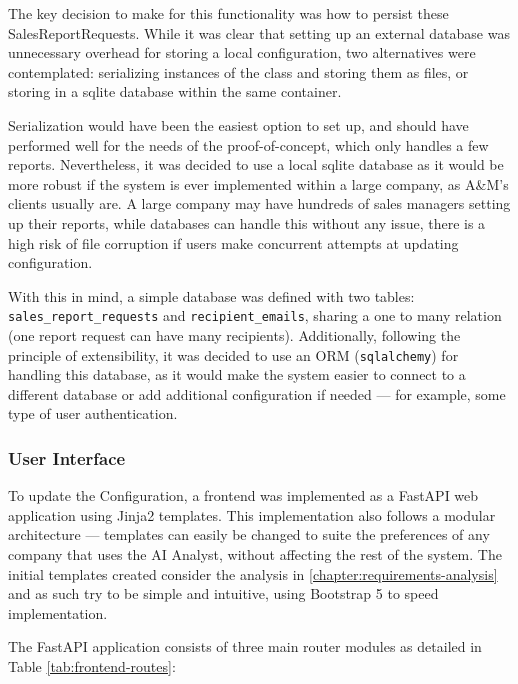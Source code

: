 \documentclass[a4paper]{report}
\begin{document}
The key decision to make for this functionality was how to persist these SalesReportRequests. While it was clear that setting up an external database was unnecessary overhead for storing a local configuration, two alternatives were contemplated: serializing instances of the class and storing them as files, or storing in a sqlite database within the same container.

Serialization would have been the easiest option to set up, and should have performed well for the needs of the proof-of-concept, which only handles a few reports. Nevertheless, it was decided to use a local sqlite database as it would be more robust if the system is ever implemented within a large company, as A\&M's clients usually are. A large company may have hundreds of sales managers setting up their reports, while databases can handle this without any issue, there is a high risk of file corruption if users make concurrent attempts at updating configuration.

With this in mind, a simple database was defined with two tables: \texttt{sales\_report\_requests} and \texttt{recipient\_emails}, sharing a one to many relation (one report request can have many recipients). Additionally, following the principle of extensibility, it was decided to use an ORM (\texttt{sqlalchemy}) for handling this database, as it would make the system easier to connect to a different database or add additional configuration if needed --- for example, some type of user authentication.

\subsubsection{User Interface}

To update the Configuration, a frontend was implemented as a FastAPI web application using Jinja2 templates. This implementation also follows a modular architecture --- templates can easily be changed to suite the preferences of any company that uses the AI Analyst, without affecting the rest of the system. The initial templates created consider the analysis in \autoref{chapter:requirements-analysis} and as such try to be simple and intuitive, using Bootstrap 5 to speed implementation.

The FastAPI application consists of three main router modules as detailed in Table \ref{tab:frontend-routes}:
\end{document}
